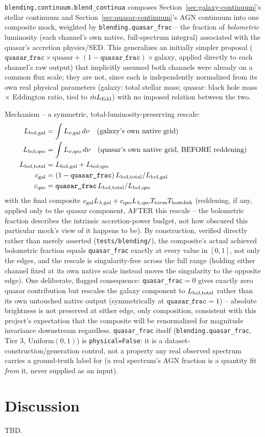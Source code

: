 \documentclass{aastex7}
\begin{document}
\texttt{blending.continuum.blend\_continua} composes
Section~\ref{sec:galaxy-continuum}'s stellar continuum and
Section~\ref{sec:quasar-continuum}'s AGN continuum into one composite mock,
weighted by \texttt{blending.quasar\_frac} -- the fraction of
\emph{bolometric} luminosity (each channel's own native, full-spectrum
integral) associated with the quasar's accretion physics/SED. This
generalizes an initially simpler proposal
($\texttt{quasar\_frac}\times\text{quasar} +
(1-\texttt{quasar\_frac})\times\text{galaxy}$, applied directly to each
channel's raw output) that implicitly assumed both channels were already on
a common flux scale; they are not, since each is independently normalized
from its own real physical parameters (galaxy: total stellar mass; quasar:
black hole mass $\times$ Eddington ratio, tied to $\dot m L_{\rm Edd}$) with
no imposed relation between the two.

Mechanism -- a symmetric, total-luminosity-preserving rescale:
\begin{align}
    L_{\rm bol,gal} &= \int L_{\nu,\rm gal}\,d\nu \quad\text{(galaxy's own native grid)}\\
    L_{\rm bol,qso} &= \int L_{\nu,\rm qso}\,d\nu \quad\text{(quasar's own native grid, BEFORE reddening)}\\
    L_{\rm bol,total} &= L_{\rm bol,gal} + L_{\rm bol,qso}\\
    c_{\rm gal} &= (1-\texttt{quasar\_frac})\, L_{\rm bol,total}/L_{\rm bol,gal}\\
    c_{\rm qso} &= \texttt{quasar\_frac}\, L_{\rm bol,total}/L_{\rm bol,qso}
\end{align}
with the final composite $c_{\rm gal} L_{\lambda,\rm gal} + c_{\rm qso}
L_{\lambda,\rm qso} T_{\rm torus} T_{\rm hostdisk}$ (reddening, if any,
applied only to the quasar component, AFTER this rescale -- the bolometric
fraction describes the intrinsic accretion-power budget, not how obscured
this particular mock's view of it happens to be). By construction, verified
directly rather than merely asserted (\texttt{tests/blending/}), the
composite's actual achieved bolometric fraction equals
\texttt{quasar\_frac} exactly at every value in $[0,1]$, not only the
edges, and the rescale is singularity-free across the full range (holding
either channel fixed at its own native scale instead moves the singularity
to the opposite edge). One deliberate, flagged consequence:
\texttt{quasar\_frac}$=0$ gives exactly zero quasar contribution but
rescales the galaxy component to $L_{\rm bol,total}$ rather than its own
untouched native output (symmetrically at $\texttt{quasar\_frac}=1$) --
absolute brightness is not preserved at either edge, only composition,
consistent with this project's expectation that the composite will be
renormalized for magnitude invariance downstream regardless.
\texttt{quasar\_frac} itself (\texttt{blending.quasar\_frac}, Tier 3,
$\mathrm{Uniform}(0,1)$) is \texttt{physical=False}: it is a
dataset-construction/generation control, not a property any real observed
spectrum carries a ground-truth label for (a real spectrum's AGN fraction
is a quantity fit \emph{from} it, never supplied as an input).

\section{Discussion}
TBD.



\end{document}
